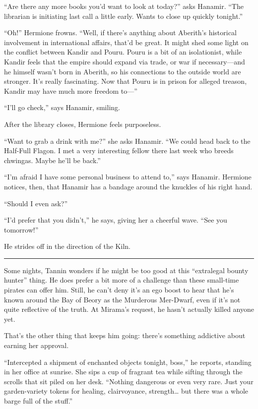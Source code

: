 \documentclass[smalldemyvopaper,11pt,twoside,onecolumn,openright,extrafontsizes]{memoir}
\begin{document}
``Are there any more books you'd want to look at today?'' asks Hanamir.
``The librarian is initiating last call a little early. Wants to close
up quickly tonight.''

``Oh!'' Hermione frowns. ``Well, if there's anything about Aberith's
historical involvement in international affairs, that'd be great. It
might shed some light on the conflict between Kandir and Pouru. Pouru is
a bit of an isolationist, while Kandir feels that the empire should
expand via trade, or war if necessary---and he himself wasn't born in
Aberith, so his connections to the outside world are stronger. It's
really fascinating. Now that Pouru is in prison for alleged treason,
Kandir may have much more freedom to---''

``I'll go check,'' says Hanamir, smiling.

After the library closes, Hermione feels purposeless.

``Want to grab a drink with me?'' she asks Hanamir. ``We could head back
to the Half-Full Flagon. I met a very interesting fellow there last week
who breeds chwingas. Maybe he'll be back.''

``I'm afraid I have some personal business to attend to,'' says Hanamir.
Hermione notices, then, that Hanamir has a bandage around the knuckles
of his right hand.

``Should I even ask?''

``I'd prefer that you didn't,'' he says, giving her a cheerful wave.
``See you tomorrow!''

He strides off in the direction of the Kiln.

\begin{center}\rule{0.5\linewidth}{\linethickness}\end{center}

Some nights, Tannin wonders if he might be too good at this ``extralegal
bounty hunter'' thing. He does prefer a bit more of a challenge than
these small-time pirates can offer him. Still, he can't deny it's an ego
boost to hear that he's known around the Bay of Beory as the Murderous
Mer-Dwarf, even if it's not quite reflective of the truth. At Mirama's
request, he hasn't actually killed anyone yet.

That's the other thing that keeps him going: there's something addictive
about earning her approval.

``Intercepted a shipment of enchanted objects tonight, boss,'' he
reports, standing in her office at sunrise. She sips a cup of fragrant
tea while sifting through the scrolls that sit piled on her desk.
``Nothing dangerous or even very rare. Just your garden-variety tokens
for healing, clairvoyance, strength\ldots{} but there was a whole barge
full of the stuff.''
\end{document}
